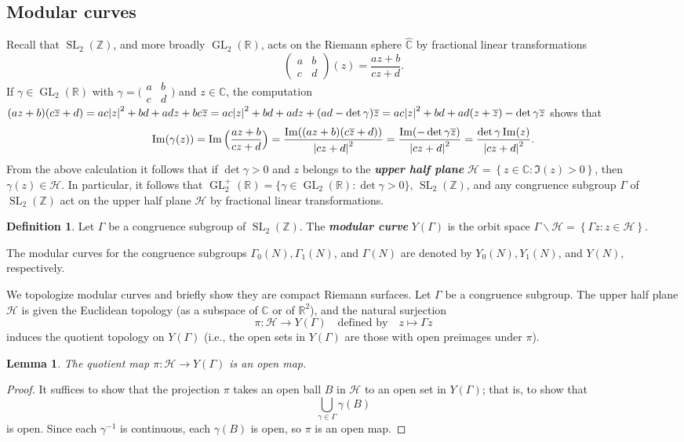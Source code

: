 \documentclass[10pt,leqno,twoside]{article}
\theoremstyle{plain}
\newtheorem{lemma}[lem]{Lemma}
\theoremstyle{definition}
\newtheorem{definition/}[lem]{Definition}
\newenvironment{definition}
  {\renewcommand{\qedsymbol}{\textdagger}%
   \pushQED{\qed}\begin{definition/}}
  {\popQED\end{definition/}}
\numberwithin{equation}{section}
\numberwithin{lem}{section}
\newcommand{\cbr}[1]{\left\{#1\right\}}
\newcommand{\textib}[1]{\textbf{\textit{#1\index{#1}}}} %
\DeclareMathOperator{\GL}{GL}
\DeclareMathOperator{\SL}{SL}
\newcommand{\smallabcd}{\big(\!\begin{smallmatrix}
    a & b \\ c & d
\end{smallmatrix}\!\big)}
\newcommand{\abcd}{\begin{pmatrix}
    a & b \\ c & d
\end{pmatrix}}
\newcommand{\slz}{\SL_2(\mathbb{Z})}
\newcommand{\glr}{\GL_2(\mathbb{R})}
\newcommand{\glrp}{\GL_2^+(\mathbb{R})}
\begin{document}
\subsection{Modular curves}
Recall that $\slz$, and more broadly $\glr$, acts on the Riemann sphere $\widehat{\mathbb{C}}$ by fractional linear transformations \[\abcd(z) = \frac{az+b}{cz+d}.\] 
If $\gamma\in \glr$ with $\gamma = \smallabcd$ and $z\in \mathbb C$, the computation $(az+b)(c\overline z + d) = ac\abs{z}^2+bd + adz + bc\overline z = ac\abs{z}^2+bd + adz + (ad-\det\gamma)\overline z = ac\abs{z}^2+bd + ad(z+\overline z) -\det\gamma\overline z$ shows that
\begin{equation}\label{eqn: imaginary parts}
    \Im(\gamma(z)) = \Im\Big(\frac{az+b}{cz+d}\Big) = \frac{\Im((az+b)(c\overline z + d))}{\abs{cz+d}^2} = \frac{\Im(-\det\gamma\overline z)}{\abs{cz+d}^2} = \frac{\det\gamma\Im(z)}{\abs{cz+d}^2}.
\end{equation}
From the above calculation it follows that if $\det \gamma >0$ and $z$ belongs to the \textib{upper half plane} $\mathcal{H} = \cbr{z\in\mathbb{C} : \Im(z)>0}$, then $\gamma(z)\in\mathcal H$. In particular, it follows that $\glrp = \{\gamma\in \glr : \det \gamma > 0\}$, $\slz$, and any congruence subgroup $\varGamma$ of $\slz$ act on the upper half plane $\mathcal H$ by fractional linear transformations.

\begin{definition}
    Let $\varGamma$ be a congruence subgroup of $\slz$. The \textib{modular curve} $Y(\varGamma)$ is the orbit space $\varGamma\backslash \mathcal{H} = \cbr{\varGamma z : z\in\mathcal H}$.
\end{definition}
The modular curves for the congruence subgroups $\varGamma_0(N), \varGamma_1(N)$, and $\varGamma(N)$ are denoted by $Y_0(N), Y_1(N)$, and $Y(N)$, respectively.

We topologize modular curves and briefly show they are compact Riemann surfaces. Let $\varGamma$ be a congruence subgroup. The upper half plane $\mathcal H$ is given the Euclidean topology (as a subspace of $\mathbb{C}$ or of $\mathbb{R}^2$), and the natural surjection \[\pi \colon \mathcal H \to Y(\varGamma)\quad \text{defined by}\quad  z\mapsto \varGamma z\] induces the quotient topology on $Y(\varGamma)$ (i.e., the open sets in $Y(\varGamma)$ are those with open preimages under $\pi$).

\begin{lemma}\label{lem: slz acts as open maps}
    The quotient map $\pi \colon \mathcal H \to Y(\varGamma)$ is an open map.
\end{lemma}
\begin{proof}
    It suffices to show that the projection $\pi$ takes an open ball $B$ in $\mathcal{H}$ to an open set in $Y(\varGamma)$; that is, to show that \[\bigcup_{\gamma\in \varGamma}\gamma(B)\] is open. Since each $\gamma^{-1}$ is continuous, each $\gamma(B)$ is open, so $\pi$ is an open map.
\end{proof}
\end{document}

